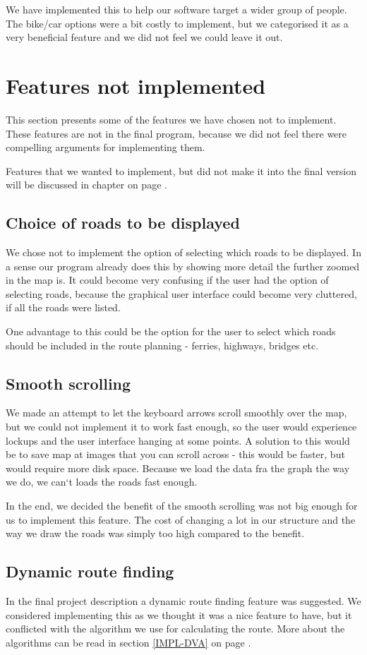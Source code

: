 We have implemented this to help our software target a wider group of people.
The bike/car options were a bit costly to implement, but we categorised it as a
very beneficial feature and we did not feel we could leave it out.
\section{Features not implemented}
\label{UIA-NI}
This section presents some of the features we have chosen not to implement.
These features are not in the final program, because we did not feel there were
compelling arguments for implementing them.

Features that we wanted to implement, but did not make it into the final version
will be discussed in chapter  on page \pageref{PRC}.
\subsection{Choice of roads to be displayed}
\label{UIA-NI-CRD}
We chose not to implement the option of selecting which roads to be displayed.
In a sense our program already does this by showing more detail the further
zoomed in the map is. It could become very confusing if the user had the option
of selecting roads, because the graphical user interface could become very
cluttered, if all the roads were listed.

One advantage to this could be the option for the user to select which roads
should be included in the route planning - ferries, highways, bridges etc. 
\subsection{Smooth scrolling}
\label{UIA-NI-SS}
We made an attempt to let the keyboard arrows scroll smoothly over the map, but
we could not implement it to work fast enough, so the user would experience
lockups and the user interface hanging at some points. A solution to this would
be to save map at images that you can scroll across - this would be faster, but
would require more disk space. Because we load the data fra the graph the way
we do, we can`t loads the roads fast enough.

In the end, we decided the benefit of the smooth scrolling was not big enough
for us to implement this feature. The cost of changing a lot in our structure
and the way we draw the roads was simply too high compared to the benefit.
\subsection{Dynamic route finding}
\label{UIA-NI-DRF}
In the final project description a dynamic route finding feature was
suggested. We considered implementing this as we thought it was a nice feature
to have, but it conflicted with the algorithm we use for calculating the route.
More about the algorithms can be read in section \ref{IMPL-DVA}
 on page \pageref{IMPL-DVA}.

